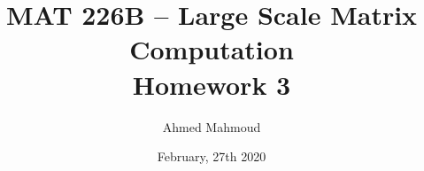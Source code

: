 \documentclass[12pt] {article}
\begin{document}
\title{MAT 226B – Large Scale Matrix Computation \\ Homework 3}
\author{Ahmed Mahmoud}
\date{February, 27th 2020} 

\maketitle










\end{document}
